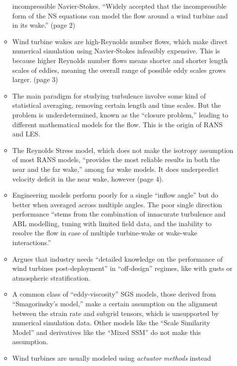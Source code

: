 \documentclass[12pt]{article}
\begin{document}
\begin{itemize}
\begin{itemize}
            incompressible Navier-Stokes. ``Widely accepted that the
            incompressible form of the NS equations can model the flow around a
            wind turbine and in its wake.'' (page 2)
        \item Wind turbine wakes are high-Reynolds number flows, which make
            direct numerical simulation using Navier-Stokes infeasibly
            expensive. This is because higher Reynolds number flows means
            shorter and shorter length scales of eddies, meaning the overall
            range of possible eddy scales grows larger. (page 3)
        \item The main paradigm for studying turbulence involve some kind of
            statistical averaging, removing certain length and time scales. But
            the problem is underdetermined, known as the ``closure problem,''
            leading to different mathematical models for the flow. This is the origin
            of RANS and LES.
        \item The Reynolds Stress model, which does not make the isotropy
            assumption of most RANS models, ``provides the most reliable
            results in both the near and the far wake,'' among far wake models. It
            does underpredict velocity deficit in the near wake, however (page 4).
        \item Engineering models perform poorly for a single ``inflow angle''
            but do better when averaged across multiple angles. The poor single
            direction performance ``stems from the combination of innacurate turbulence
            and ABL modelling, tuning with limited field data, and the inability to resolve the
            flow in case of multiple turbine-wake or wake-wake interactions.''
        \item Argues that industry needs ``detailed knowledge on the
            performance of wind turbines post-deployment'' in ``off-design''
            regimes, like with gusts or atmospheric stratification.
        \item A common class of ``eddy-viscosity'' SGS models, those derived
            from ``Smagorinsky's model,'' make a certain assumption on the
            alignment between the strain rate and subgrid tensors, which is
            unsupported by numerical simulation data. Other models like the
            ``Scale Similarity Model'' and derivatives like the ``Mixed SSM''
            do not make this assumption.
        \item Wind turbines are usually modeled using \emph{actuator methods} instead

\end{itemize}
\end{itemize}
\end{document}

